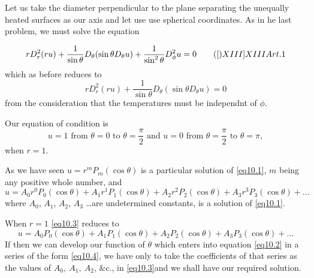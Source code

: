 \documentclass[oneside,12pt]{book}
\begin{document}
Let us take the diameter perpendicular to the plane separating the unequally heated surfaces as our axis and let use use spherical coordinates. As in he last problem, we must solve the equation 

\begin{equation*}
    rD_r^2(ru)+\frac{1}{\sin\theta}D_\theta(\sin\theta D_\theta u)+\frac{1}{\sin^2\theta}D_\phi^2u=0
    \tag[XIII]{XIII Art. 1}
\end{equation*}
which as before reduces to 
\setcounter{equation}{0}
\begin{equation}
    rD_r^2(ru)+\frac{1}{\sin\theta}D_\theta(\sin\theta D_\theta u)=0
    \label{eq10.1}
\end{equation}
from the consideration that the temperatures must be independnt of $\phi$. \par 

Our equation of condition is 
\begin{equation}
    u=1\text{ from }\theta=0\text{ to }\theta=\frac{\pi}{2}\text{ and }u=0\text{ from }\theta=\frac{\pi}{2}\text{ to }\theta=\pi,
    \label{eq10.2}
\end{equation}
when $r=1$. \par 

As we have seen $u=r^mP_m(\cos\theta)$ is a particular solution of \eqref{eq10.1}, $m$ being any positive whole number, and 
\begin{equation}
    u=A_0r^0P_0(\cos\theta)+A_1r^1P_1(\cos\theta)+A_2r^2P_2(\cos\theta)+A_3r^3P_3(\cos\theta)+\dots 
    \label{eq10.3}
\end{equation}
where $A_0$, $A_1$, $A_2$, $A_3$ \dots are undetermined constants, is a solution of \eqref{eq10.1}. \par 

When $r=1$ \eqref{eq10.3} reduces to 
\begin{equation}
    u=A_0P_0(\cos\theta)+A_1P_1(\cos\theta)+A_2P_2(\cos\theta)+A_3P_3(\cos\theta)+\dots 
    \label{eq10.4}
\end{equation}
If then we can develop our function of $\theta$ which enters into equation \eqref{eq10.2} in a series of the form \eqref{eq10.4}, we have only to take the coefficients of that series as the values of $A_0,\: A_1,\: A_2$, \&c., in \eqref{eq10.3}and we shall have our required solution. \par 
\end{document}
